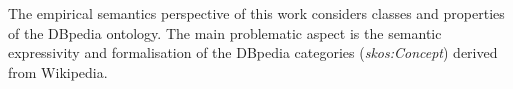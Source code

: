The empirical semantics perspective of this work considers classes and properties of the DBpedia ontology. The main problematic aspect is the semantic expressivity and formalisation of the DBpedia categories (\textit{skos:Concept}) derived from Wikipedia.